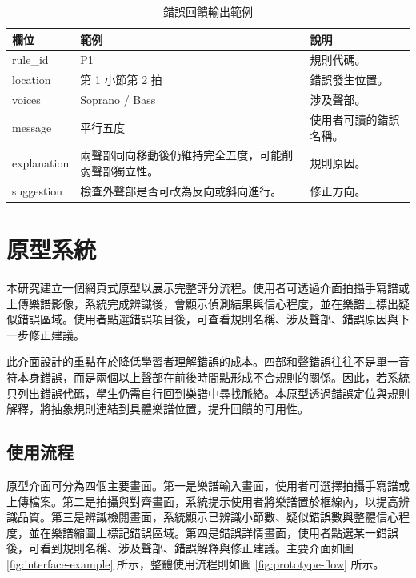 \documentclass[12pt,a4paper]{article}
\begin{document}
\begin{table}[htbp]
  \centering
  \caption{錯誤回饋輸出範例}
  \label{tab:feedback}
  \begin{tabular}{p{2.3cm}p{3.2cm}p{7.7cm}}
    \toprule
    欄位 & 範例 & 說明 \\
    \midrule
    rule\_id & P1 & 規則代碼。 \\
    location & 第 1 小節第 2 拍 & 錯誤發生位置。 \\
    voices & Soprano / Bass & 涉及聲部。 \\
    message & 平行五度 & 使用者可讀的錯誤名稱。 \\
    explanation & 兩聲部同向移動後仍維持完全五度，可能削弱聲部獨立性。 & 規則原因。 \\
    suggestion & 檢查外聲部是否可改為反向或斜向進行。 & 修正方向。 \\
    \bottomrule
  \end{tabular}
\end{table}

\section{原型系統}

本研究建立一個網頁式原型以展示完整評分流程。使用者可透過介面拍攝手寫譜或上傳樂譜影像，系統完成辨識後，會顯示偵測結果與信心程度，並在樂譜上標出疑似錯誤區域。使用者點選錯誤項目後，可查看規則名稱、涉及聲部、錯誤原因與下一步修正建議。

此介面設計的重點在於降低學習者理解錯誤的成本。四部和聲錯誤往往不是單一音符本身錯誤，而是兩個以上聲部在前後時間點形成不合規則的關係。因此，若系統只列出錯誤代碼，學生仍需自行回到樂譜中尋找脈絡。本原型透過錯誤定位與規則解釋，將抽象規則連結到具體樂譜位置，提升回饋的可用性。

\subsection{使用流程}

原型介面可分為四個主要畫面。第一是樂譜輸入畫面，使用者可選擇拍攝手寫譜或上傳檔案。第二是拍攝與對齊畫面，系統提示使用者將樂譜置於框線內，以提高辨識品質。第三是辨識檢閱畫面，系統顯示已辨識小節數、疑似錯誤數與整體信心程度，並在樂譜縮圖上標記錯誤區域。第四是錯誤詳情畫面，使用者點選某一錯誤後，可看到規則名稱、涉及聲部、錯誤解釋與修正建議。主要介面如圖 \ref{fig:interface-example} 所示，整體使用流程則如圖 \ref{fig:prototype-flow} 所示。
\end{document}
